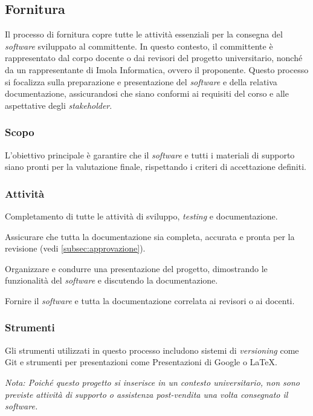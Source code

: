 \subsection{Fornitura}
Il processo di fornitura copre tutte le attività essenziali per la consegna del \textit{software} sviluppato al committente.
In questo contesto, il committente è rappresentato dal corpo docente o dai
revisori del progetto universitario, nonché da un rappresentante di Imola
Informatica, ovvero il proponente.
Questo processo si focalizza sulla preparazione e presentazione del \textit{software} e della relativa documentazione, assicurandosi che siano conformi ai requisiti del corso e alle aspettative degli \textit{stakeholder}.

\subsubsection{Scopo}
L'obiettivo principale è garantire che il \textit{software} e tutti i materiali
di supporto siano pronti per la valutazione finale, rispettando i criteri di
accettazione definiti.

\subsubsection{Attività}
Completamento di tutte le attività di sviluppo, \textit{testing} e documentazione.


Assicurare che tutta la documentazione sia completa, accurata e pronta per la revisione
(vedi \cref{subsec:approvazione}).

Organizzare e condurre una presentazione del progetto, dimostrando le 
funzionalità del \textit{software} e discutendo la documentazione.

 Fornire il \textit{software} e tutta la
documentazione correlata ai revisori o ai docenti.

\subsubsection{Strumenti}
Gli strumenti utilizzati in questo processo includono sistemi di
\textit{versioning} come Git e strumenti per presentazioni come Presentazioni di Google o LaTeX.

\textit{Nota: Poiché questo progetto si inserisce in un contesto universitario,
	non sono previste attività di supporto o assistenza post-vendita una volta
	consegnato il \textit{software}.}
